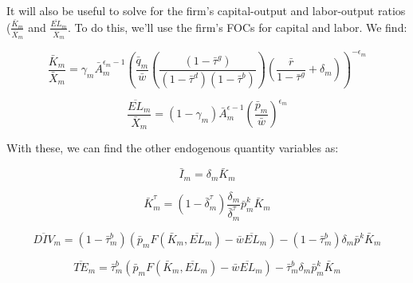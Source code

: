 \documentclass[letterpaper,12pt]{article}
\theoremstyle{definition}
\begin{document}
\begin{spacing}{1.5}
It will also be useful to solve for the firm's capital-output and labor-output ratios ($\frac{\bar{K}_{m}}{\bar{X}_{m}}$ and $\frac{\overline{EL}_{m}}{\bar{X}_{m}}$.  To do this, we'll use the firm's FOCs for capital and labor.  We find:

\begin{equation}
\label{eqn:k_over_x_tax_ss}
\frac{\bar{K}_{m}}{\bar{X}_{m}} = \gamma_{m}\bar{A}_{m}^{\epsilon_{m}-1} \left(\frac{\bar{q}_{m}}{\bar{w}}\left(\frac{(1-\bar{\tau}^{g})}{(1-\bar{\tau}^{d})(1-\bar{\tau}^{b})}\right)\left(\frac{\bar{r}}{1-\bar{\tau}^{g}}+\delta_{m}\right)\right)^{-\epsilon_{m}}
\end{equation}

\begin{equation}
\label{eqn:l_over_x_tax_ss}
\frac{\overline{EL}_{m}}{\bar{X}_{m}} = (1-\gamma_{m})\bar{A}_{m}^{\epsilon-1}\left(\frac{\bar{p}_{m}}{\bar{w}}\right)^{\epsilon_{m}}
\end{equation}

With these, we can find the other endogenous quantity variables as:

\begin{equation}
\bar{I}_{m} = \delta_{m}\bar{K}_{m} 
\end{equation}

\begin{equation}
\bar{K}^{\tau}_{m} = (1-\bar{\delta}^{\tau}_{m})\frac{\delta_{m}}{\bar{\delta}^{\tau}_{m}}\bar{p}^{k}_{m}\bar{K}_{m} 
\end{equation}

\begin{equation}
\overline{DIV}_{m} = (1-\bar{\tau}^{b}_{m})\left(\bar{p}_{m}F(\bar{K}_{m},\overline{EL}_{m}) - \bar{w}\overline{EL}_{m}\right) - (1-\bar{\tau}^{b}_{m})\delta_{m}\bar{p}^{k}\bar{K}_{m}
\end{equation}

\begin{equation}
\label{eqn:inc_tax_firm_ss}
\overline{TE}_{m} =\bar{\tau}^{b}_{m}\left(\bar{p}_{m}F(\bar{K}_{m},\overline{EL}_{m})-\bar{w}\overline{EL}_{m} \right) - \bar{\tau}^{b}_{m}\delta_{m}\bar{p}^{k}_{m}\bar{K}_{m} 
\end{equation}


\end{spacing}
\end{document}
